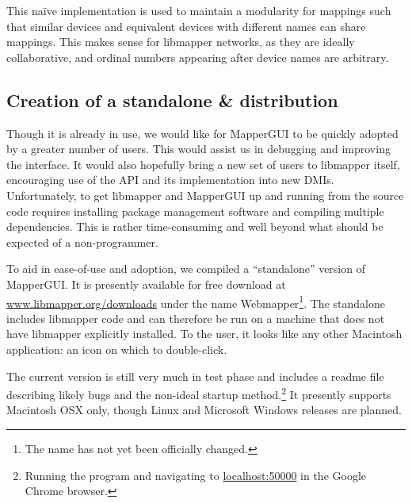 This na\"ive implementation is used to maintain a modularity for mappings such that similar devices and equivalent devices with different names can share mappings. This makes sense for libmapper networks, as they are ideally collaborative, and ordinal numbers appearing after device names are arbitrary. 
	

	\subsection{Creation of a standalone \& distribution} %
	\label{sec:creation_of_a_standalone_and_distribution}
	
Though it is already in use, we would like for MapperGUI to be quickly adopted by a greater number of users. This would assist us in debugging and improving the interface. It would also hopefully bring a new set of users to libmapper itself, encouraging use of the API and its implementation into new DMIs. Unfortunately, to get libmapper and MapperGUI up and running from the source code requires installing package management software and compiling multiple dependencies. This is rather time-consuming and well beyond what should be expected of a non-programmer. 

To aid in ease-of-use and adoption, we compiled a ``standalone'' version of MapperGUI. It is presently available for free download at \url{www.libmapper.org/downloads} under the name Webmapper\footnote{The name has not yet been officially changed.}. The standalone includes libmapper code and can therefore be run on a machine that does not have libmapper explicitly installed. To the user, it looks like any other Macintosh application: an icon on which to double-click.

The current version is still very much in test phase and includes a readme file describing likely bugs and the non-ideal startup method.\footnote{Running the program and navigating to \url{localhost:50000} in the Google Chrome browser.} It presently supports Macintosh OSX only, though Linux and Microsoft Windows releases are planned.






